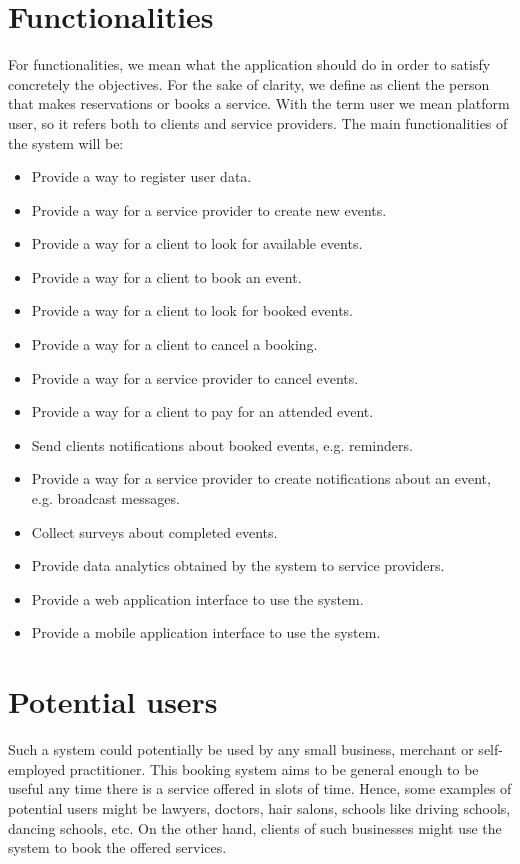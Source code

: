 \documentclass{article}
\begin{document}
\section{Functionalities}
For functionalities, we mean what the application should do in order to satisfy concretely the objectives. For the sake of clarity, we define as client the person that makes reservations or books a service. With the term user we mean platform user, so it refers both to clients and service providers. The main functionalities of the system will be:
\begin{itemize}
    \item Provide a way to register user data.
    \item Provide a way for a service provider to create new events.
    \item Provide a way for a client to look for available events.
    \item Provide a way for a client to book an event.
    \item Provide a way for a client to look for booked events.
    \item Provide a way for a client to cancel a booking.
    \item Provide a way for a service provider to cancel events.
    \item Provide a way for a client to pay for an attended event.
    \item Send clients notifications about booked events, e.g. reminders.
    \item Provide a way for a service provider to create notifications about an event, e.g. broadcast messages.
    \item Collect surveys about completed events.
    \item Provide data analytics obtained by the system to service providers.
    \item Provide a web application interface to use the system.
    \item Provide a mobile application interface to use the system.
\end{itemize}

\section{Potential users}
Such a system could potentially be used by any small business, merchant or
self-employed practitioner. This booking system aims to be general enough to be
useful any time there is a service offered in slots of time. Hence, some 
examples of potential users might be lawyers, doctors, hair salons, schools like driving schools, dancing schools, etc. On the other hand, clients of such businesses might use the system to book the offered services.
\end{document}
